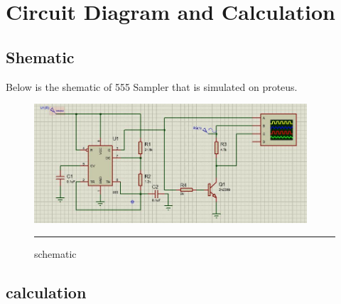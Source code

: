 
\chapter{Circuit Diagram and Calculation} %
\label{Chapter2}
 \section{Shematic}
 Below is the shematic of 555 Sampler that is simulated on proteus.
 	\begin{figure}[htbp]
	\centering
	\includegraphics[width = 4in]{./Figures/schematic.jpg}
	\rule{35em}{0.5pt}
	\caption{schematic}
\end{figure}

 \section{calculation}
